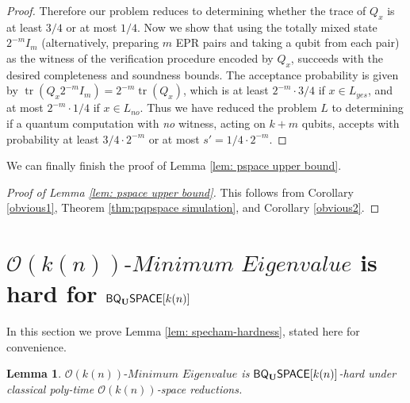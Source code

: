 \documentclass[11pt]{article}
\newtheorem{lemma}[theorem]{Lemma}
\theoremstyle{definition}
\theoremstyle{remark}
\newcommand\spechamiltonian[1]{\ensuremath{#1}\textit{-Minimum Eigenvalue}}
\newcommand{\classfont}{\sf}
\newcommand{\Unitary}{\mathbf{U}}
\newcommand{\unitaryBQSPACE}[1]{{\classfont{BQ}_\Unitary\classfont{SPACE}}[#1]}
\newcommand\bigoh{\mathcal{O}}
\DeclareMathOperator{\tr}{tr}
\begin{document}
\begin{proof}
Therefore our problem reduces to determining whether the trace of $Q_x$ is at least $3/4$ or at most $1/4$.  Now we show that using the totally mixed state $2^{-m}I_m$ (alternatively, preparing $m$ EPR pairs and taking a qubit from each pair) as the witness of the verification procedure encoded by $Q_x$, succeeds with the desired completeness and soundness bounds.  The acceptance probability is given by
$\tr(Q_x 2^{-m}I_m) = 2^{-m} \tr(Q_x)$,
which is at least $2^{-m} \cdot 3/4$ if $x\in L_{yes}$, and at most $2^{-m} \cdot 1/4$ if $x\in L_{no}$. Thus we have reduced the problem $L$ to determining if a quantum computation with \emph{no} witness, acting on $k+m$ qubits, accepts with probability at least $3/4 \cdot 2^{-m}$ or at most $s'=1/4 \cdot 2^{-m}$.
\end{proof}
We can finally finish the proof of Lemma \ref{lem: pspace upper bound}.
\begin{proof}[Proof of Lemma \ref{lem: pspace upper bound}]
This follows from Corollary \ref{obvious1}, Theorem \ref{thm:pqpspace simulation}, and Corollary \ref{obvious2}.
\end{proof}




\section{$\spechamiltonian{\bigoh(k(n))}$ is hard for $\unitaryBQSPACE{k(n)}$} \label{sec: specham-hardness}
In this section we prove Lemma \ref{lem: specham-hardness}, stated here for convenience.
\begingroup
\def\thelemma{\ref{lem: specham-hardness}}
\begin{lemma}
$\spechamiltonian{\bigoh(k(n))}$ is $\unitaryBQSPACE{k(n)}$-hard under classical poly-time $\bigoh(k(n))$-space reductions.
\end{lemma}
\addtocounter{theorem}{-1}
\endgroup
\end{document}
